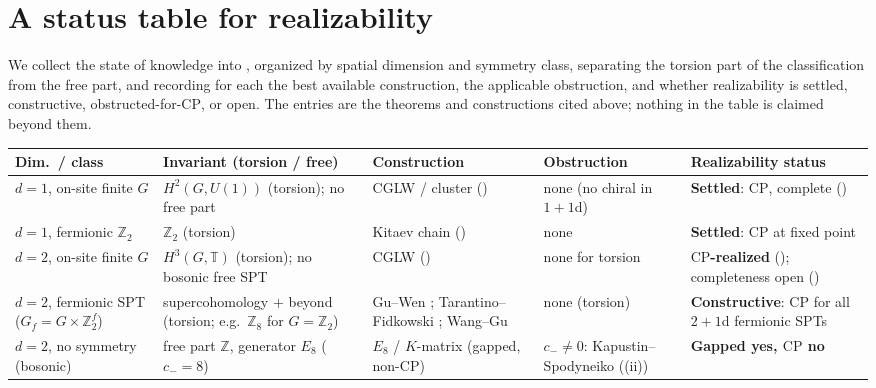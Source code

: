 \documentclass[12pt]{article}
\newcommand{\CP}{\mathrm{CP}}                    %
\newcommand{\Ztwo}{\mathbb{Z}_2}
\newcommand{\Zint}{\mathbb{Z}}
\newcommand{\Circ}{\mathbb{T}}                   %
\theoremstyle{definition}
\theoremstyle{remark}
\begin{document}
\section{A status table for realizability}
\label{sec:table}

We collect the state of knowledge into , organized by spatial dimension and
symmetry class, separating the torsion part of the classification from the free part, and
recording for each the best available construction, the applicable obstruction, and whether
realizability is settled, constructive, obstructed-for-$\CP$, or open. The entries are the
theorems and constructions cited above; nothing in the table is claimed beyond them.

\begin{table}[htbp]
\centering
\footnotesize
\setlength{\tabcolsep}{4pt}
\renewcommand{\arraystretch}{1.4}
\begin{tabular}{@{}L{0.13\textwidth}L{0.18\textwidth}L{0.17\textwidth}L{0.21\textwidth}L{0.22\textwidth}@{}}
\toprule
\textbf{Dim.\ / class} & \textbf{Invariant (torsion / free)} & \textbf{Construction} &
\textbf{Obstruction} & \textbf{Realizability status} \\
\midrule
$d=1$, on-site finite $G$ &
$H^2(G,U(1))$ (torsion); no free part &
CGLW / cluster () &
none (no chiral in $1+1$d) &
\textbf{Settled}: $\CP$, complete () \\

$d=1$, fermionic $\Ztwo$ &
$\Ztwo$ (torsion) &
Kitaev chain () &
none &
\textbf{Settled}: $\CP$ at fixed point \\

$d=2$, on-site finite $G$ &
$H^3(G,\Circ)$ (torsion); no bosonic free SPT &
CGLW () &
none for torsion &
\textbf{$\CP$-realized} (); completeness open () \\

$d=2$, fermionic SPT ($G_f{=}G{\times}\Ztwo^f$) &
supercohomology $+$ beyond (torsion; e.g.\ $\Zint_8$ for $G{=}\Ztwo$) &
Gu--Wen \cite{gu-wen-supercohomology}; Tarantino--Fidkowski \cite{tarantino-fidkowski}; Wang--Gu \cite{wang-gu-fermionic} &
none (torsion) &
\textbf{Constructive}: $\CP$ for all $2{+}1$d fermionic SPTs \\

$d=2$, no symmetry (bosonic) &
free part $\Zint$, generator $E_8$ ($c_-=8$) &
$E_8$ / $K$-matrix (gapped, non-$\CP$) &
$c_-\ne0$: Kapustin--Spodyneiko ((ii)) &
\textbf{Gapped yes, $\CP$ no} \\


\end{tabular}
\end{table}
\end{document}
